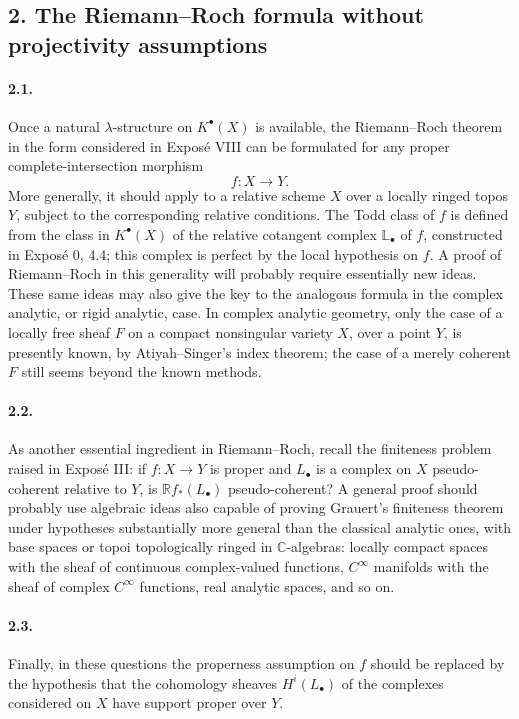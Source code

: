 \documentclass[11pt]{article}
\theoremstyle{plain}
\theoremstyle{definition}
\theoremstyle{remark}
\newcommand{\CC}{\mathbb C}
\newcommand{\RR}{\mathbb R}
\begin{document}
\subsection*{2. The Riemann--Roch formula without projectivity assumptions}

\paragraph{2.1.}
Once a natural $\lambda$-structure on $K^\bullet(X)$ is available, the Riemann--Roch theorem in the form considered in Exposé VIII can be formulated for any proper complete-intersection morphism
\[
f:X\to Y.
\]
More generally, it should apply to a relative scheme $X$ over a locally ringed topos $Y$, subject to the corresponding relative conditions. The Todd class of $f$ is defined from the class in $K^\bullet(X)$ of the relative cotangent complex $\mathbb L_\bullet$ of $f$, constructed in Exposé 0, 4.4; this complex is perfect by the local hypothesis on $f$. A proof of Riemann--Roch in this generality will probably require essentially new ideas. These same ideas may also give the key to the analogous formula in the complex analytic, or rigid analytic, case. In complex analytic geometry, only the case of a locally free sheaf $F$ on a compact nonsingular variety $X$, over a point $Y$, is presently known, by Atiyah--Singer's index theorem; the case of a merely coherent $F$ still seems beyond the known methods.

\paragraph{2.2.}
As another essential ingredient in Riemann--Roch, recall the finiteness problem raised in Exposé III: if $f:X\to Y$ is proper and $L_\bullet$ is a complex on $X$ pseudo-coherent relative to $Y$, is $\RR f_*(L_\bullet)$ pseudo-coherent? A general proof should probably use algebraic ideas also capable of proving Grauert's finiteness theorem under hypotheses substantially more general than the classical analytic ones, with base spaces or topoi topologically ringed in $\CC$-algebras: locally compact spaces with the sheaf of continuous complex-valued functions, $C^\infty$ manifolds with the sheaf of complex $C^\infty$ functions, real analytic spaces, and so on.

\paragraph{2.3.}
Finally, in these questions the properness assumption on $f$ should be replaced by the hypothesis that the cohomology sheaves $H^i(L_\bullet)$ of the complexes considered on $X$ have support proper over $Y$.
\end{document}
